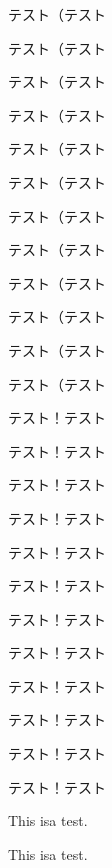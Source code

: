 \documentclass[twocolumn]{jarticle}
\begin{document}
テスト\linebreak（テスト\par    %
テスト\linebreak[4]（テスト\par %
テスト\linebreak[3]（テスト\par
テスト\linebreak[2]（テスト\par
テスト\linebreak[1]（テスト\par
テスト\linebreak[0]（テスト\par
テスト\nolinebreak（テスト\par
テスト\nolinebreak[4]（テスト\par
テスト\nolinebreak[3]（テスト\par
テスト\nolinebreak[2]（テスト\par
テスト\nolinebreak[1]（テスト\par
テスト\nolinebreak[0]（テスト\par
テスト\linebreak！テスト\par    %
テスト\linebreak[4]！テスト\par %
テスト\linebreak[3]！テスト\par
テスト\linebreak[2]！テスト\par
テスト\linebreak[1]！テスト\par
テスト\linebreak[0]！テスト\par
テスト\nolinebreak！テスト\par
テスト\nolinebreak[4]！テスト\par
テスト\nolinebreak[3]！テスト\par
テスト\nolinebreak[2]！テスト\par
テスト\nolinebreak[1]！テスト\par
テスト\nolinebreak[0]！テスト\par
\newpage
This is\linebreak a test.\par     %
This is\linebreak[4] a test.\par  %
\end{document}
